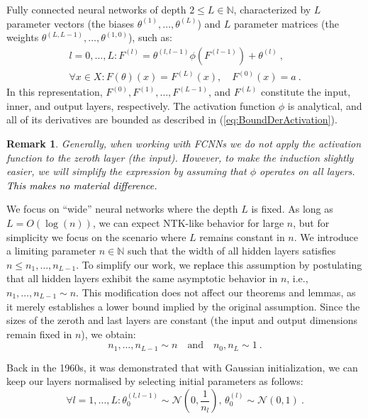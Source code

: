 \documentclass{article} %
\newtheorem{remark}{Remark}
[section]
\begin{document}
Fully connected neural networks of depth \(2 \leq L \in \mathbb{N}\), characterized by \(L\) parameter vectors (the biases \(\theta^{(1)},\ldots,\theta^{(L)}\)) and \(L\) parameter matrices (the weights \(\theta^{(L,L-1)},\ldots,\theta^{(1,0)}\)), such as:
\begin{equation}
\begin{array}{c}
l=0,\ldots,L:F^{(l)}=\theta^{(l,l-1)}\phi\left(F^{(l-1)}\right)+\theta^{(l)}\ ,\\
\forall x\in X:F(\theta)\left(x\right)=F^{(L)}\left(x\right),\quad F^{(0)}\left(x\right)=a \ .
\end{array}
\label{eq:FNC}
\end{equation}
In this representation, \(F^{(0)}, F^{(1)},\ldots,F^{(L-1)}\), and \(F^{(L)}\) constitute the input, inner, and output layers, respectively. The activation function \(\phi\) is analytical, and all of its derivatives are bounded as described in (\ref{eq:BoundDerActivation}).

\begin{remark}
\textup
{Generally, when working with FCNNs we do not apply the activation function to the zeroth layer (the input). However, to make the induction slightly easier, we will simplify the expression by assuming that \(\phi\) operates on all layers. \textcolor{black}{This makes no material difference.}}
\end{remark}

We focus on ``wide'' neural networks where the depth \(L\) is fixed.
As long as \(L=O(\log(n))\), we can expect NTK-like behavior for large \(n\), but for simplicity we focus on the scenario where \(L\) remains constant in \(n\).
We introduce a limiting parameter \(n\in\mathbb{N}\) such that the width of all hidden layers satisfies \(n \leq n_1,\ldots,n_{L-1}\).
To simplify our work, we \textcolor{black}{replace} this assumption by postulating that all hidden layers exhibit the same asymptotic behavior in \(n\), i.e., \(n_1,\ldots,n_{L-1}\sim n\).
This modification does not affect our theorems and lemmas, as it merely establishes a lower bound implied by the original assumption.
Since the sizes of the zeroth and last layers are constant (the input and output dimensions remain fixed in \(n\)), we obtain:
\begin{equation}
n_{1},\ldots,n_{L-1}\sim n\quad\text{and}\quad n_{0},n_{L}\sim1 \ .
\end{equation}

Back in the 1960s, it was demonstrated that with Gaussian initialization, we can keep our layers normalised by selecting initial parameters as follows:
\begin{equation}
\label{eq:GaussianInitialisation}
\forall l=1,\ldots,L:\theta_{0}^{(l,l-1)}\sim\mathcal{N}\left(0,\frac{1}{{n_{l}}}\right),\,\theta_{0}^{(l)}\sim\mathcal{N}\left(0,1\right) \ .
\end{equation}
\end{document}
